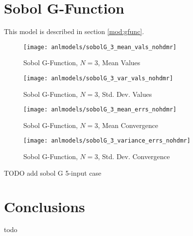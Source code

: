 \section{Sobol G-Function}
This model is described in section \ref{mod:gfunc}.
\begin{figure}[H]
  \centering
  \texttt{[image: anlmodels/sobolG\_3\_mean\_vals\_nohdmr]}
  \caption{Sobol G-Function, $N=3$, Mean Values}
  \label{fig:sobolG mean values 3}
\end{figure}
\begin{figure}[H]
  \centering
  \texttt{[image: anlmodels/sobolG\_3\_var\_vals\_nohdmr]}
  \caption{Sobol G-Function, $N=3$, Std. Dev. Values}
  \label{fig:sobolG var values 3}
\end{figure}

\begin{figure}[H]
  \centering
  \texttt{[image: anlmodels/sobolG\_3\_mean\_errs\_nohdmr]}
  \caption{Sobol G-Function, $N=3$, Mean Convergence}
  \label{fig:sobolG mean errors 3}
\end{figure}
\begin{figure}[H]
  \centering
  \texttt{[image: anlmodels/sobolG\_3\_variance\_errs\_nohdmr]}
  \caption{Sobol G-Function, $N=3$, Std. Dev. Convergence}
  \label{fig:sobolG var errors 3}
\end{figure}

 TODO add sobol G 5-input case
\section{Conclusions}
todo
